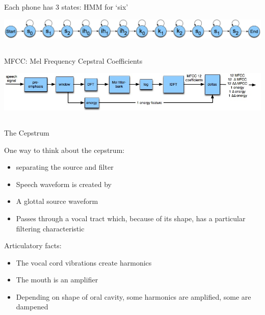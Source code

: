 \documentclass[9pt,xcolor=pdftex,dvipsnames,table]{beamer}
\begin{document}
\subsection{}
\begin{frame}{Each phone has 3 states: HMM for `six'}


    \includegraphics[scale=.26]{ASR9-7.jpg}

\end{frame}

\subsection{}
\begin{frame}{MFCC: Mel Frequency Cepstral Coefficients}


    \includegraphics[scale=.38]{ASR9-8.jpg}

\end{frame}

\subsection{}
\begin{frame}{The Cepstrum}

{\large One way to think about the cepstrum:}
\begin{itemize}
	\item separating the source and filter
	\item Speech waveform is created by
	\item A glottal source waveform
	\item Passes through a vocal tract which, because of its shape, has a particular filtering characteristic 
\end{itemize}
\vspace{.25cm}

{\large Articulatory facts:}
\begin{itemize}
     \item The vocal cord vibrations create harmonics
     \item The mouth is an amplifier
     \item Depending on shape of oral cavity, some harmonics are amplified, some are dampened
\end{itemize}
\end{frame}
\end{document}
